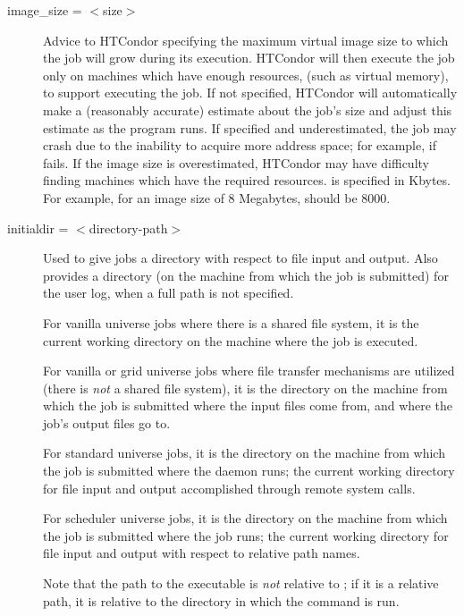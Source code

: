\begin{description}

\label{condor-submit-image-size}
\item[image\_size = $<$size$>$] Advice to HTCondor specifying the maximum
virtual image size to which the job will grow during its execution.
HTCondor will then execute the job only on machines which have enough resources,
(such as virtual memory), to support executing the job.
If not specified, HTCondor will automatically make a (reasonably accurate)
estimate about the job's size and adjust this estimate as the program runs.
If specified and underestimated, the job may crash due to
the inability to acquire more address space; 
for example, if  fails. 
If the image size is overestimated,
HTCondor may have difficulty finding machines which have the required resources.
 is specified in Kbytes. 
For example, for an image size of 8 Megabytes,  should be 8000.


\label{man-condor-submit-initialdir}
\item[initialdir = $<$directory-path$>$] 
Used to give jobs a directory with respect to file input and output.
Also provides a directory 
(on the machine from which the job is submitted)
for the user log, when a full path is not specified. 

For vanilla universe jobs where there is a shared file system,
it is the current working directory on the machine where the
job is executed.

For vanilla or grid universe jobs where file transfer mechanisms are
utilized (there is \emph{not} a shared file system),
it is the directory on the machine from which the job is submitted
where the input files come from, and where the job's output
files go to.

For standard universe jobs,
it is the directory on the machine from which the job is submitted
where the  daemon runs;
the current working directory for file input and output accomplished
through remote system calls.

For scheduler universe jobs,
it is the directory on the machine from which the job is submitted
where the job runs;
the current working directory for file input and output with
respect to relative path names.

Note that the path to the executable is \emph{not} relative to
; if it is a relative path, it is relative to the
directory in which the  command is run.


\end{description}
